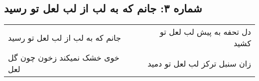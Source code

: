 \begin{center}
\section*{شماره ۳: جانم که به لب از لب لعل تو رسید}
\label{sec:003}
\begin{longtable}{l p{0.5cm} r}
جانم که به لب از لب لعل تو رسید
&&
دل تحفه به پیش لب لعل تو کشید
\\
خوی خشک نمیکند زخون چون گل لعل
&&
زان سنبل ترکز لب لعل تو دمید
\\
\end{longtable}
\end{center}
